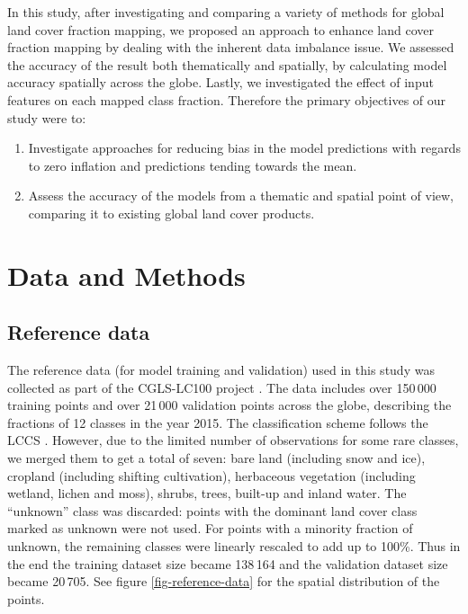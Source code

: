 \documentclass[review,authoryear,3p]{elsarticle}
\begin{document}

In this study, after investigating and comparing a variety of methods for global land cover fraction mapping, we proposed an approach to enhance land cover fraction mapping by dealing with the inherent data imbalance issue.
We assessed the accuracy of the result both thematically and spatially, by calculating model accuracy spatially across the globe.
Lastly, we investigated the effect of input features on each mapped class fraction.
Therefore the primary objectives of our study were to:

\begin{enumerate}
 \item Investigate approaches for reducing bias in the model predictions with regards to zero inflation and predictions tending towards the mean.
 \item Assess the accuracy of the models from a thematic and spatial point of view, comparing it to existing global land cover products.
\end{enumerate}

\section{Data and Methods}

\subsection{Reference data}

The reference data (for model training and validation) used in this study was collected as part of the \ac{CGLS-LC100} project \citep{buchhorn_copernicus_2020, nandin-erdene_tsendbazar_copernicus_2019}.
The data includes over 150\,000 training points and over 21\,000 validation points across the globe, describing the fractions of 12 classes in the year 2015.
The classification scheme follows the \gls{LCCS} \citep{buchhorn_copernicus_2020}.
However, due to the limited number of observations for some rare classes, we merged them to get a total of seven: bare land (including snow and ice), cropland (including shifting cultivation), herbaceous vegetation (including wetland, lichen and moss), shrubs, trees, built-up and inland water.
The ``unknown'' class was discarded: points with the dominant land cover class marked as unknown were not used.
For points with a minority fraction of unknown, the remaining classes were linearly rescaled to add up to 100\%.
Thus in the end the training dataset size became 138\,164 and the validation dataset size became 20\,705. See figure \ref{fig-reference-data} for the spatial distribution of the points.
\end{document}
